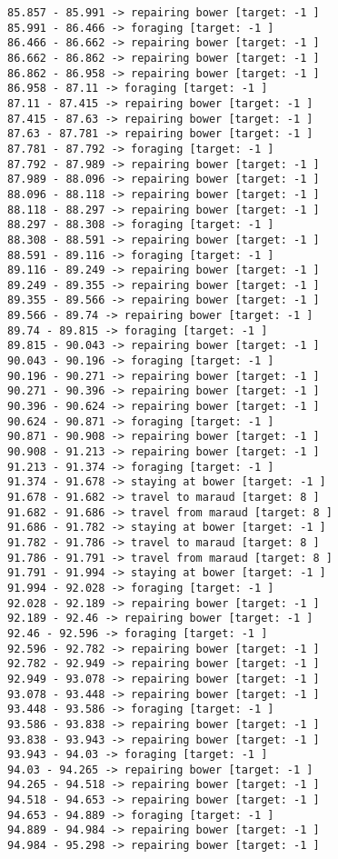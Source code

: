 \documentclass[11pt]{article}
\begin{document}
\begin{Verbatim}[commandchars=\\\{\}]
85.857 - 85.991 -> repairing bower [target: -1 ]
85.991 - 86.466 -> foraging [target: -1 ]
86.466 - 86.662 -> repairing bower [target: -1 ]
86.662 - 86.862 -> repairing bower [target: -1 ]
86.862 - 86.958 -> repairing bower [target: -1 ]
86.958 - 87.11 -> foraging [target: -1 ]
87.11 - 87.415 -> repairing bower [target: -1 ]
87.415 - 87.63 -> repairing bower [target: -1 ]
87.63 - 87.781 -> repairing bower [target: -1 ]
87.781 - 87.792 -> foraging [target: -1 ]
87.792 - 87.989 -> repairing bower [target: -1 ]
87.989 - 88.096 -> repairing bower [target: -1 ]
88.096 - 88.118 -> repairing bower [target: -1 ]
88.118 - 88.297 -> repairing bower [target: -1 ]
88.297 - 88.308 -> foraging [target: -1 ]
88.308 - 88.591 -> repairing bower [target: -1 ]
88.591 - 89.116 -> foraging [target: -1 ]
89.116 - 89.249 -> repairing bower [target: -1 ]
89.249 - 89.355 -> repairing bower [target: -1 ]
89.355 - 89.566 -> repairing bower [target: -1 ]
89.566 - 89.74 -> repairing bower [target: -1 ]
89.74 - 89.815 -> foraging [target: -1 ]
89.815 - 90.043 -> repairing bower [target: -1 ]
90.043 - 90.196 -> foraging [target: -1 ]
90.196 - 90.271 -> repairing bower [target: -1 ]
90.271 - 90.396 -> repairing bower [target: -1 ]
90.396 - 90.624 -> repairing bower [target: -1 ]
90.624 - 90.871 -> foraging [target: -1 ]
90.871 - 90.908 -> repairing bower [target: -1 ]
90.908 - 91.213 -> repairing bower [target: -1 ]
91.213 - 91.374 -> foraging [target: -1 ]
91.374 - 91.678 -> staying at bower [target: -1 ]
91.678 - 91.682 -> travel to maraud [target: 8 ]
91.682 - 91.686 -> travel from maraud [target: 8 ]
91.686 - 91.782 -> staying at bower [target: -1 ]
91.782 - 91.786 -> travel to maraud [target: 8 ]
91.786 - 91.791 -> travel from maraud [target: 8 ]
91.791 - 91.994 -> staying at bower [target: -1 ]
91.994 - 92.028 -> foraging [target: -1 ]
92.028 - 92.189 -> repairing bower [target: -1 ]
92.189 - 92.46 -> repairing bower [target: -1 ]
92.46 - 92.596 -> foraging [target: -1 ]
92.596 - 92.782 -> repairing bower [target: -1 ]
92.782 - 92.949 -> repairing bower [target: -1 ]
92.949 - 93.078 -> repairing bower [target: -1 ]
93.078 - 93.448 -> repairing bower [target: -1 ]
93.448 - 93.586 -> foraging [target: -1 ]
93.586 - 93.838 -> repairing bower [target: -1 ]
93.838 - 93.943 -> repairing bower [target: -1 ]
93.943 - 94.03 -> foraging [target: -1 ]
94.03 - 94.265 -> repairing bower [target: -1 ]
94.265 - 94.518 -> repairing bower [target: -1 ]
94.518 - 94.653 -> repairing bower [target: -1 ]
94.653 - 94.889 -> foraging [target: -1 ]
94.889 - 94.984 -> repairing bower [target: -1 ]
94.984 - 95.298 -> repairing bower [target: -1 ]

\end{Verbatim}
\end{document}

